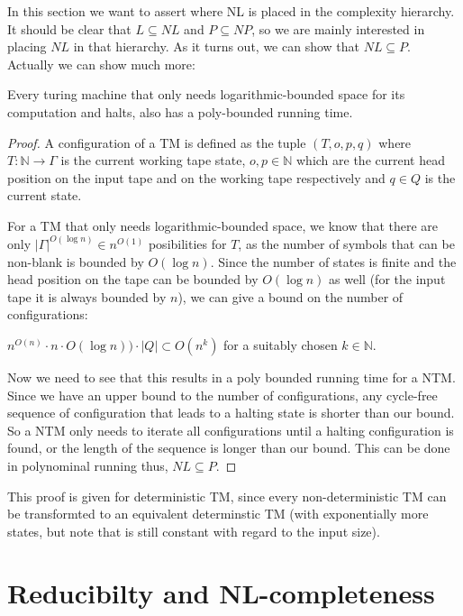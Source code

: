In this section we want to assert where NL is placed in the complexity
hierarchy. It should be clear that $L \subseteq NL$ and
$P \subseteq NP$, so we are mainly interested in placing $NL$ in that
hierarchy. As it turns out, we can show that $NL \subseteq P$. Actually
we can show much more: \vspace{0.5cm}

\begin{thm}
\label{poly-running-time}
Every turing machine that only needs logarithmic-bounded space for its computation and halts, also has a poly-bounded running time.
\end{thm}

\begin{proof}
A configuration of a TM is defined as the tuple $(T, o, p, q)$ where $T: \mathbb{N} \longrightarrow \Gamma$ is the current working tape state,
$o, p \in \mathbb{N}$ which are the current head position on the input tape and on the working tape respectively and $q \in Q$ is the current state.

For a TM that only needs logarithmic-bounded space, we know that there are only $|\Gamma|^{O(\log n)} \in n^{O(1)}$ posibilities for $T$,
as the number of symbols that can be non-blank is bounded by $O(\log n)$. Since the number of states is finite and the head position on the tape
can be bounded by $O(\log n)$ as well (for the input tape it is always bounded by $n$), we can give a bound on the number of configurations:

$n^{O(n)} \cdot n \cdot O(\log n)) \cdot |Q| \subset O(n^k)$ for a suitably chosen $k \in \mathbb{N}$.

Now we need to see that this results in a poly bounded running time for a NTM.
Since we have an upper bound to the number of configurations, any cycle-free sequence of configuration that leads to a halting state
is shorter than our bound. So a NTM only needs to iterate all configurations until a halting configuration is found, or
the length of the sequence is longer than our bound.
This can be done in polynominal running thus, $NL \subseteq P$.

\end{proof}

This proof is given for deterministic TM, since every non-deterministic
TM can be transformted to an equivalent determinstic TM (with
exponentially more states, but note that is still constant with regard
to the input size).

\section{Reducibilty and
NL-completeness}\label{reducibilty-and-nl-completeness}

